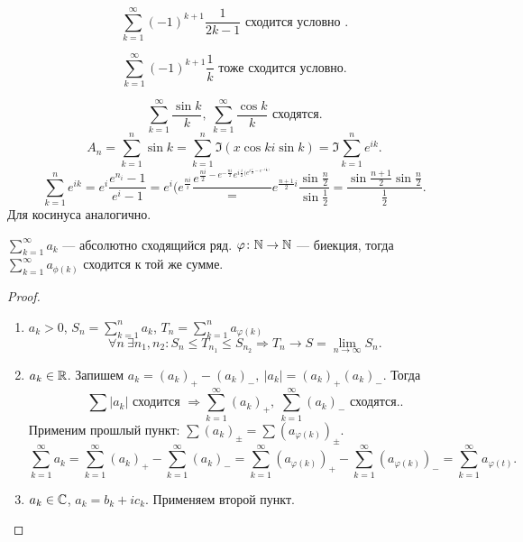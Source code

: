 \begin{ex}
    \[
	\sum_{k=1}^{\infty} (-1)^{k+1}\frac{1}{2k-1} \text{ сходится условно }
    .\] 
\end{ex}
\begin{ex}
    \[
	\sum_{k=1}^{\infty} (-1)^{k+1}\frac{1}{k} \text{ тоже сходится условно}
    .\] 
\end{ex}
\begin{ex}
    \[
	\sum_{k=1}^{\infty} \frac{\sin k}{k}, ~ \sum_{k=1}^{\infty} \frac{\cos k}{k} \text{ сходятся}
    .\] 
    \[
	A_n = \sum_{k=1}^{n}  \sin k= \sum_{k=1}^{n}  \Im (x\cos k  i \sin k) = \Im \sum_{k=1}^{n}  e^{ik}
    .\] 
    \[
	\sum_{k=1}^{n}  e^{ik} =  e^{i} \frac{e^{n_i} - 1}{e^{i} - 1}=
	e^{i }(e^{\frac{ni}{i}} \frac{e^{\frac{ni}{2}-e^{-\frac{ni}{2}}{e^{i \frac{i}{2}(e^{i\frac{i}{2}-e^{-i\frac{i}{2})}}}}}} = e^{\frac{n+1}{2}i} \frac{\sin \frac{n}{2}}{\sin \frac{1}{2}} = \frac{\sin \frac{n+1}{2}\sin \frac{n}{2}}{\frac{1}{2}}
    .\] 
    Для косинуса аналогично.
\end{ex}
\begin{thm}
    $ \sum_{k=1}^{\infty}a_k $ --- абсолютно сходящийся ряд.
    $ \varphi \colon \mathbb{N} \to \mathbb{N}$ --- биекция, тогда $ \sum_{k=1}^{\infty} a_{\phi(k)}$ сходится к той же сумме.
\end{thm}
\begin{proof}
    \begin{enumerate}
	\item $ a_k > 0$,  $ S_n = \sum_{k=1}^{n} a_k$, $ T_n = \sum_{k=1}^{n} a_{\varphi(k)}$
	    \[
	    \forall  n ~ \exists  n_1, n_2 \colon S_n \le T_{n_1} \le S_{n_2} \Longrightarrow T_n \to  S = \lim_{n \to \infty} S_n
	    .\] 
	\item $ a_k \in  \mathbb{R}$. Запишем $ a_k = (a_k)_+ - (a_k)_-, ~ \lvert a_k \rvert  = (a_k)_+ (a_k)_-$.
	    Тогда 
	    \[
		\sum{\lvert a_k \rvert }  \text{ сходится } \Longrightarrow   \sum_{k=1}^{\infty} (a_k)_+, ~\sum_{k=1}^{\infty} (a_k)_- \text{ сходятся}.
	    .\] 
	    Применим прошлый пункт: $ \sum{(a_k)_\pm}  = \sum(a_{\varphi(k)})_\pm  $.
	    \[
		\sum_{k=1}^{\infty} a_k = \sum_{k=1}^{\infty}(a_k)_+ - \sum_{k=1}^{\infty} (a_k)_- = \sum_{k=1}^{\infty} (a_{ \varphi (k)})_+ - \sum_{k=1}^{\infty} (a_{ \varphi (k)})_- = \sum_{k=1}^{\infty}  a_{ \varphi (t)}  
	    .\] 
	\item $ a_k \in \mathbb{C}$, $ a_ k= b_k + i c_k$. Применяем второй пункт.
    \end{enumerate}
\end{proof}
